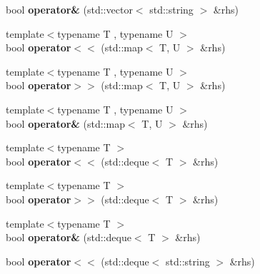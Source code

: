 \begin{DoxyCompactItemize}
\item 
\hypertarget{classBinaryStream_a9e4c2437ef5cbac2a919fb92ebbcbbce}{bool {\bfseries operator\&} (std\-::vector$<$ std\-::string $>$ \&rhs)}\label{classBinaryStream_a9e4c2437ef5cbac2a919fb92ebbcbbce}

\item 
\hypertarget{classBinaryStream_aaf43cee52c70268e098df62287114826}{{\footnotesize template$<$typename T , typename U $>$ }\\bool {\bfseries operator$<$$<$} (std\-::map$<$ T, U $>$ \&rhs)}\label{classBinaryStream_aaf43cee52c70268e098df62287114826}

\item 
\hypertarget{classBinaryStream_a1198ba811ea9b81e32bfd757253e3c5b}{{\footnotesize template$<$typename T , typename U $>$ }\\bool {\bfseries operator$>$$>$} (std\-::map$<$ T, U $>$ \&rhs)}\label{classBinaryStream_a1198ba811ea9b81e32bfd757253e3c5b}

\item 
\hypertarget{classBinaryStream_a67e220208d517aba27b88393abdd6f61}{{\footnotesize template$<$typename T , typename U $>$ }\\bool {\bfseries operator\&} (std\-::map$<$ T, U $>$ \&rhs)}\label{classBinaryStream_a67e220208d517aba27b88393abdd6f61}

\item 
\hypertarget{classBinaryStream_a477414ce94998ca75c85213c577f3a61}{{\footnotesize template$<$typename T $>$ }\\bool {\bfseries operator$<$$<$} (std\-::deque$<$ T $>$ \&rhs)}\label{classBinaryStream_a477414ce94998ca75c85213c577f3a61}

\item 
\hypertarget{classBinaryStream_aee6c9bf64e87b5409700b0528b00e7e6}{{\footnotesize template$<$typename T $>$ }\\bool {\bfseries operator$>$$>$} (std\-::deque$<$ T $>$ \&rhs)}\label{classBinaryStream_aee6c9bf64e87b5409700b0528b00e7e6}

\item 
\hypertarget{classBinaryStream_a22f187a7a8946216327ff1ab3b1cc1e5}{{\footnotesize template$<$typename T $>$ }\\bool {\bfseries operator\&} (std\-::deque$<$ T $>$ \&rhs)}\label{classBinaryStream_a22f187a7a8946216327ff1ab3b1cc1e5}

\item 
\hypertarget{classBinaryStream_abe970728b8a7ad30f95ac152f36e0885}{bool {\bfseries operator$<$$<$} (std\-::deque$<$ std\-::string $>$ \&rhs)}\label{classBinaryStream_abe970728b8a7ad30f95ac152f36e0885}


\end{DoxyCompactItemize}
